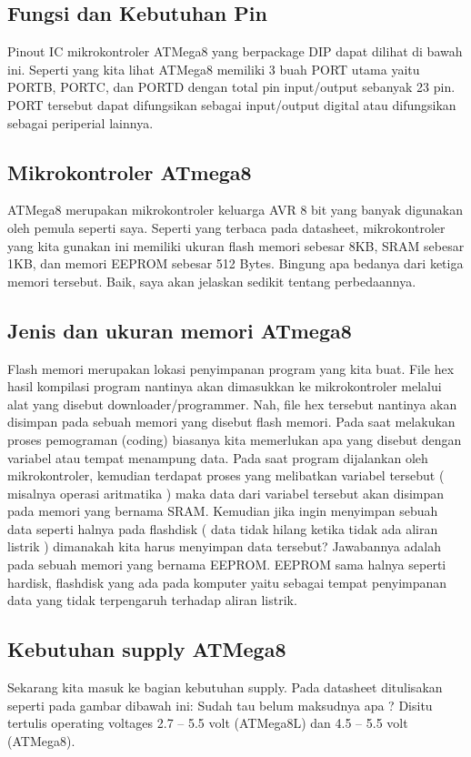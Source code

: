 	\subsection{Fungsi dan Kebutuhan Pin}
		Pinout IC mikrokontroler ATMega8 yang berpackage DIP dapat dilihat di bawah ini.
		Seperti yang kita lihat ATMega8 memiliki 3 buah PORT utama yaitu PORTB, PORTC, dan PORTD dengan total pin input/output sebanyak 23 pin. PORT tersebut dapat difungsikan sebagai input/output digital atau difungsikan sebagai periperial lainnya.
		
	\subsection{Mikrokontroler ATmega8}
		ATMega8 merupakan mikrokontroler keluarga AVR 8 bit yang banyak digunakan oleh pemula seperti saya. Seperti yang terbaca pada datasheet, mikrokontroler yang kita gunakan ini memiliki ukuran flash memori sebesar 8KB, SRAM sebesar 1KB, dan memori EEPROM sebesar 512 Bytes. Bingung apa bedanya dari ketiga memori tersebut. Baik, saya akan jelaskan sedikit tentang perbedaannya.
	\subsection{Jenis dan ukuran memori ATmega8}
		Flash memori merupakan lokasi penyimpanan program yang kita buat. File hex hasil kompilasi program nantinya akan dimasukkan ke mikrokontroler melalui alat yang disebut downloader/programmer. Nah, file hex tersebut nantinya akan disimpan pada sebuah memori yang disebut flash memori. Pada saat melakukan proses pemograman (coding) biasanya kita memerlukan apa yang disebut dengan variabel atau tempat menampung data.
		Pada saat program dijalankan oleh mikrokontroler, kemudian terdapat proses yang melibatkan variabel tersebut ( misalnya operasi aritmatika ) maka data dari variabel tersebut akan disimpan pada memori yang bernama SRAM. Kemudian jika ingin menyimpan sebuah data seperti halnya pada flashdisk ( data tidak hilang ketika tidak ada aliran listrik ) dimanakah kita harus menyimpan data tersebut? Jawabannya adalah pada sebuah memori yang bernama EEPROM. EEPROM sama halnya seperti hardisk, flashdisk yang ada pada komputer yaitu sebagai tempat penyimpanan data yang tidak terpengaruh terhadap aliran listrik.
	\subsection{Kebutuhan supply ATMega8}
		Sekarang kita masuk ke bagian kebutuhan supply. Pada datasheet ditulisakan seperti pada gambar dibawah ini:
		Sudah tau belum maksudnya apa ? Disitu tertulis operating voltages 2.7 – 5.5 volt (ATMega8L) dan 4.5 – 5.5 volt (ATMega8).
